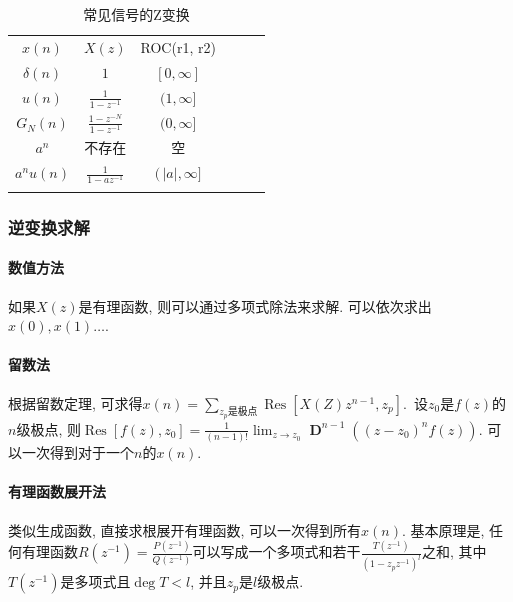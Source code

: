 \documentclass{ctexart}
\DeclareMathOperator{\D}{\mathbf{D}}
\DeclareMathOperator{\Res}{\mathrm{Res}}
\newlength{\Oldarrayrulewidth}
\newcommand{\Hline}[1]{
  \noalign{\global\setlength{\Oldarrayrulewidth}{\arrayrulewidth}}
  \noalign{\global\setlength{\arrayrulewidth}{#1}}\hline
  \noalign{\global\setlength{\arrayrulewidth}{\Oldarrayrulewidth}}}
\newcommand{\Topline}{\Hline{0.08em}}
\newcommand{\Bottomline}{\Hline{0.08em}}
\newcommand{\Midline}{\Hline{0.05em}}
\begin{document}
    \begin{table}[ht!]
    \centering
    \begin{tabularx}{\textwidth}{|SCSCSC|}
            \Topline $\displaystyle x(n)$ & $\displaystyle X(z)$ & ROC(r1, r2) \\ \Midline
            $\displaystyle \delta(n) $ & $\displaystyle 1 $ & $\displaystyle [0, \infty]$ \\
            $\displaystyle u(n) $ & $\displaystyle \frac{1}{1 - z^{-1}}$ & $\displaystyle (1, \infty] $\\
            $\displaystyle G_N(n) $ & $\displaystyle \frac{1 - z^{-N}}{1 - z^{-1}}  $ & $\displaystyle (0, \infty] $\\
            $\displaystyle a^n $ & 不存在 & 空 \\
            $\displaystyle a^nu(n) $ & $\displaystyle \frac{1}{1 - az^{-1}}$ & $\displaystyle (\,|a|, \infty]  $\\
            \Bottomline
    \end{tabularx}
    \caption{常见信号的Z变换}
    \end{table}

\subsubsection{逆变换求解}
\paragraph{数值方法} 如果$X(z)$是有理函数, 则可以通过多项式除法来求解. 可以依次求出$x(0), x(1) \ldots$.
\paragraph{留数法} 根据留数定理, 可求得$x(n) = \sum_{z_p\text{是极点}} \Res\left[X(Z) z^{n - 1}, z_p\right]$.\
    设$z_0$是$f(z)$的$n$级极点, 则$\Res[f(z), z_0] = \frac{1}{(n-1)!} \lim_{z \to z_0} \D^{n-1} \left( (z - z_0)^n f(z) \right)$.
    可以一次得到对于一个$n$的$x(n)$.
\paragraph{有理函数展开法} 类似生成函数, 直接求根展开有理函数, 可以一次得到所有$x(n)$.
    基本原理是, 任何有理函数$R(z^{-1}) = \frac{P(z^{-1})}{Q(z^{-1})}$可以写成一个多项式和若干$\frac{T(z^{-1})}{(1-z_pz^{-1})^l}$之和,
        其中$T(z^{-1})$是多项式且$\deg T < l$, 并且$z_p$是$l$级极点.
\end{document}
